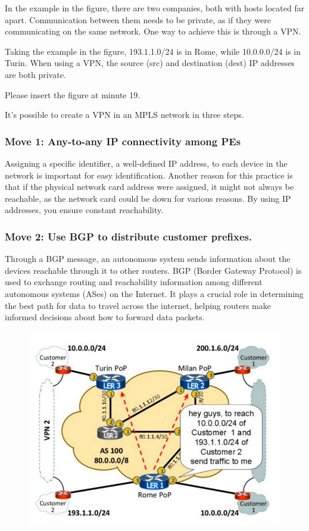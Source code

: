 \documentclass[12pt]{article}
\begin{document}
In the example in the figure, there are two companies, both with hosts located far apart. Communication between them needs to be private, as if they were communicating on the same network. One way to achieve this is through a VPN.

Taking the example in the figure, 193.1.1.0/24 is in Rome, while 10.0.0.0/24 
is in Turin. When using a VPN, the source (src) and destination (dest) IP addresses are both private.

Please insert the figure at minute 19.

It's possible to create a VPN in an MPLS network in three steps.

\subsubsection*{Move 1: Any-to-any IP connectivity among PEs}

Assigning a specific identifier, a well-defined IP address, 
to each device in the network is important for easy identification. 
Another reason for this practice is that if the physical network card address were assigned, it might not always be reachable, as the network card could be down for various reasons. 
By using IP addresses, you ensure constant reachability.

\newpage
\subsubsection*{Move 2: Use BGP to distribute customer prefixes. }

Through a BGP message, an autonomous system sends information about 
the devices reachable through it to other routers. 
BGP (Border Gateway Protocol) is used to exchange routing and reachability information among different autonomous systems (ASes) on the Internet. It plays a crucial role in determining the best path for data to travel across the internet, helping routers 
make informed decisions about how to forward data packets.

\begin{figure}[ht]
    \includegraphics[scale = 0.4]{Example4.png}
    \centering
\end{figure}
\end{document}
